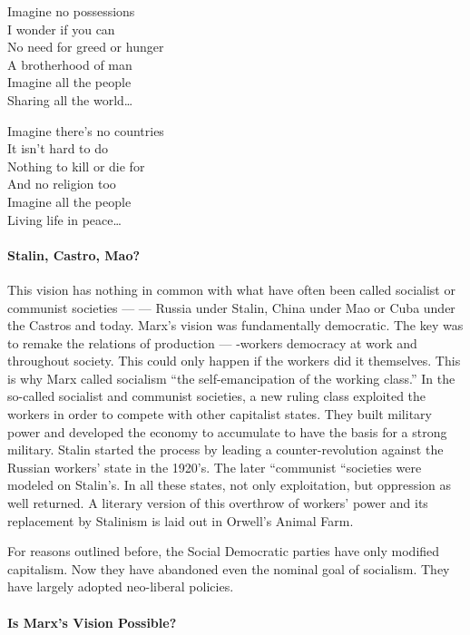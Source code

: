 \begin{displayquote}
Imagine no possessions\\
I wonder if you can\\
No need for greed or hunger\\
A brotherhood of man\\
Imagine all the people\\
Sharing all the world…

Imagine there’s no countries\\
It isn’t hard to do\\
Nothing to kill or die for\\
And no religion too\\
Imagine all the people\\
Living life in peace…
\end{displayquote}

\paragraph{Stalin, Castro, Mao?}

This vision has nothing in common with what have often been called socialist or communist societies — — Russia under Stalin, China under Mao or Cuba under the Castros and today. Marx’s vision was fundamentally democratic. The key was to remake the relations of production — -workers democracy at work and throughout society. This could only happen if the workers did it themselves. This is why Marx called socialism “the self-emancipation of the working class.” In the so-called socialist and communist societies, a new ruling class exploited the workers in order to compete with other capitalist states. They built military power and developed the economy to accumulate to have the basis for a strong military. Stalin started the process by leading a counter-revolution against the Russian workers’ state in the 1920’s. The later “communist “societies were modeled on Stalin’s. In all these states, not only exploitation, but oppression as well returned. A literary version of this overthrow of workers’ power and its replacement by Stalinism is laid out in Orwell’s Animal Farm.

For reasons outlined before, the Social Democratic parties have only modified capitalism. Now they have abandoned even the nominal goal of socialism. They have largely adopted neo-liberal policies.

\paragraph{Is Marx’s Vision Possible?}

